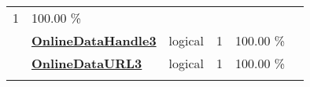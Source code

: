 \documentclass[]{article}
\begin{document}
\begin{longtable}[]{@{}lllrcl@{}}
\begin{minipage}[t]{0.10\columnwidth}
1\strut
\end{minipage} & \begin{minipage}[t]{0.10\columnwidth}\centering\strut
100.00 \%\strut
\end{minipage} & \begin{minipage}[t]{0.12\columnwidth}\raggedright\strut
\strut
\end{minipage}\tabularnewline
\begin{minipage}[t]{0.07\columnwidth}\raggedright\strut
\strut
\end{minipage} & \begin{minipage}[t]{0.35\columnwidth}\raggedright\strut
\textbf{\protect\hyperlink{onlinedatahandle3}{OnlineDataHandle3}}\strut
\end{minipage} & \begin{minipage}[t]{0.11\columnwidth}\raggedright\strut
logical\strut
\end{minipage} & \begin{minipage}[t]{0.10\columnwidth}\raggedleft\strut
1\strut
\end{minipage} & \begin{minipage}[t]{0.10\columnwidth}\centering\strut
100.00 \%\strut
\end{minipage} & \begin{minipage}[t]{0.12\columnwidth}\raggedright\strut
\strut
\end{minipage}\tabularnewline
\begin{minipage}[t]{0.07\columnwidth}\raggedright\strut
\strut
\end{minipage} & \begin{minipage}[t]{0.35\columnwidth}\raggedright\strut
\textbf{\protect\hyperlink{onlinedataurl3}{OnlineDataURL3}}\strut
\end{minipage} & \begin{minipage}[t]{0.11\columnwidth}\raggedright\strut
logical\strut
\end{minipage} & \begin{minipage}[t]{0.10\columnwidth}\raggedleft\strut
1\strut
\end{minipage} & \begin{minipage}[t]{0.10\columnwidth}\centering\strut
100.00 \%\strut
\end{minipage} & \begin{minipage}[t]{0.12\columnwidth}\raggedright\strut
\strut
\end{minipage}\tabularnewline
\begin{minipage}[t]{0.07\columnwidth}\raggedright\strut
\strut

\end{minipage}
\end{longtable}
\end{document}
